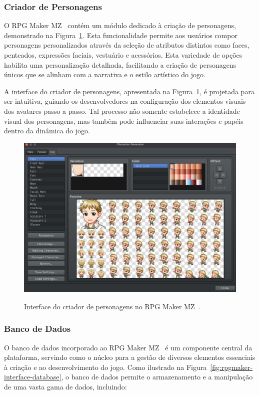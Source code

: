 \newpage

\subsubsection*{Criador de Personagens}
O RPG Maker MZ~\cite{RPGMakerMZ} contém um módulo dedicado à criação de personagens, demonstrado na Figura~\ref{fig:rpgmaker-criador-personagens}. Esta funcionalidade permite aos usuários compor personagens personalizados através da seleção de atributos distintos como faces, penteados, expressões faciais, vestuário e acessórios. Esta variedade de opções habilita uma personalização detalhada, facilitando a criação de personagens únicos que se alinham com a narrativa e o estilo artístico do jogo.

A interface do criador de personagens, apresentada na Figura~\ref{fig:rpgmaker-criador-personagens}, é projetada para ser intuitiva, guiando os desenvolvedores na configuração dos elementos visuais dos avatares passo a passo. Tal processo não somente estabelece a identidade visual dos personagens, mas também pode influenciar suas interações e papéis dentro da dinâmica do jogo.

\begin{figure}[ht!]
	\centering
	\caption{Interface do criador de personagens no RPG Maker MZ~\cite{RPGMakerMZ}.}
	\includegraphics[scale=0.25]{Textuais/Pictures/Picture5.png}
	\label{fig:rpgmaker-criador-personagens}
\end{figure}

\newpage

\subsubsection*{Banco de Dados}
O banco de dados incorporado ao RPG Maker MZ~\cite{RPGMakerMZ} é um componente central da plataforma, servindo como o núcleo para a gestão de diversos elementos essenciais à criação e ao desenvolvimento do jogo. Como ilustrado na Figura~\ref{fig:rpgmaker-interface-database}, o banco de dados permite o armazenamento e a manipulação de uma vasta gama de dados, incluindo:

